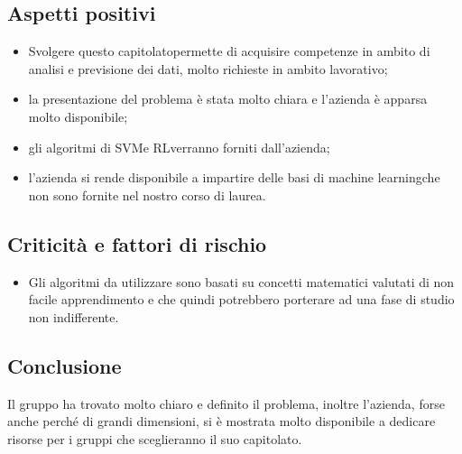 \subsection{Aspetti positivi}
\begin{itemize} 
	\item Svolgere questo capitolato\glosp permette di acquisire competenze in ambito di analisi e previsione dei dati, molto richieste in ambito lavorativo;
	\item la presentazione del problema è stata molto chiara e l'azienda è apparsa molto disponibile;
	\item gli algoritmi di SVM\glosp e RL\glosp verranno forniti dall'azienda;
    \item l'azienda si rende disponibile a impartire delle basi di machine learning\glosp che non sono fornite nel nostro corso di laurea.
\end{itemize}
\subsection{Criticità e fattori di rischio}
\begin{itemize}
	\item Gli algoritmi da utilizzare sono basati su concetti matematici valutati di non facile apprendimento e che quindi potrebbero porterare ad una fase di studio non indifferente. 
\end{itemize}
\subsection{Conclusione}
Il gruppo ha trovato molto chiaro e definito il problema, inoltre l'azienda, forse anche perché di grandi dimensioni, si è mostrata molto disponibile a dedicare risorse per i gruppi che sceglieranno il suo capitolato\glo.
